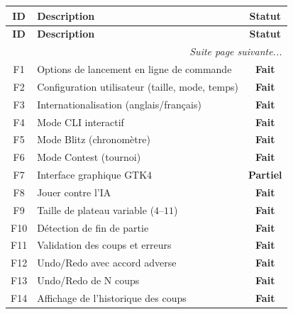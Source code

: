 \documentclass[a4paper]{article}
\providecommand{\toprule}{\hline}
\providecommand{\midrule}{\hline}
\providecommand{\bottomrule}{\hline}
\begin{document}

\begin{longtable}{c p{7cm} c}
\toprule
\textbf{ID} & \textbf{Description} & \textbf{Statut} \\
\midrule
\endfirsthead
\toprule
\textbf{ID} & \textbf{Description} & \textbf{Statut} \\
\midrule
\endhead

\midrule
\multicolumn{3}{r}{\textit{Suite page suivante...}} \\
\endfoot

\bottomrule
\endlastfoot

F1 & Options de lancement en ligne de commande & \textcolor{fait}{\textbf{Fait}} \\
F2 & Configuration utilisateur (taille, mode, temps) & \textcolor{fait}{\textbf{Fait}} \\
F3 & Internationalisation (anglais/français) & \textcolor{fait}{\textbf{Fait}} \\

\midrule

F4 & Mode CLI interactif & \textcolor{fait}{\textbf{Fait}} \\
F5 & Mode Blitz (chronomètre) & \textcolor{fait}{\textbf{Fait}} \\
F6 & Mode Contest (tournoi) & \textcolor{fait}{\textbf{Fait}} \\
F7 & Interface graphique GTK4 & \textcolor{partiel}{\textbf{Partiel}} \\
F8 & Jouer contre l'IA & \textcolor{fait}{\textbf{Fait}} \\
F9 & Taille de plateau variable ($4$--$11$) & \textcolor{fait}{\textbf{Fait}} \\

\midrule

F10 & Détection de fin de partie & \textcolor{fait}{\textbf{Fait}} \\
F11 & Validation des coups et erreurs & \textcolor{fait}{\textbf{Fait}} \\
F12 & Undo/Redo avec accord adverse & \textcolor{fait}{\textbf{Fait}} \\
F13 & Undo/Redo de N coups & \textcolor{fait}{\textbf{Fait}} \\
F14 & Affichage de l'historique des coups & \textcolor{fait}{\textbf{Fait}} \\


\end{longtable}
\end{document}
